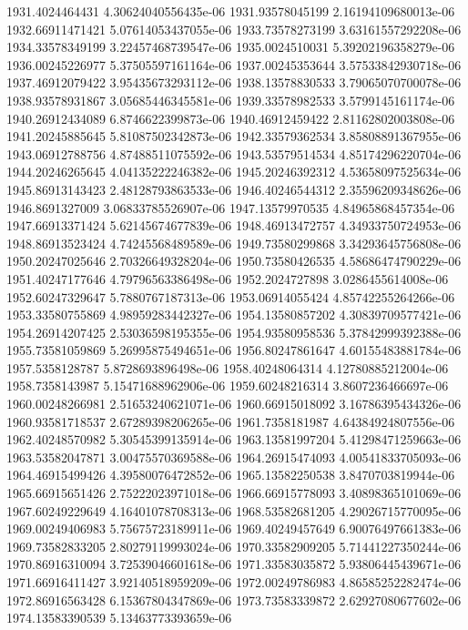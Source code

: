 {1931.4024464431 4.30624040556435e-06
1931.93578045199 2.16194109680013e-06
1932.66911471421 5.07614053437055e-06
1933.73578273199 3.63161557292208e-06
1934.33578349199 3.22457468739547e-06
1935.0024510031 5.39202196358279e-06
1936.00245226977 5.37505597161164e-06
1937.00245353644 3.57533842930718e-06
1937.46912079422 3.95435673293112e-06
1938.13578830533 3.79065070700078e-06
1938.93578931867 3.05685446345581e-06
1939.33578982533 3.5799145161174e-06
1940.26912434089 6.8746622399873e-06
1940.46912459422 2.81162802003808e-06
1941.20245885645 5.81087502342873e-06
1942.33579362534 3.85808891367955e-06
1943.06912788756 4.87488511075592e-06
1943.53579514534 4.85174296220704e-06
1944.20246265645 4.04135222246382e-06
1945.20246392312 4.53658097525634e-06
1945.86913143423 2.48128793863533e-06
1946.40246544312 2.35596209348626e-06
1946.8691327009 3.06833785526907e-06
1947.13579970535 4.84965868457354e-06
1947.66913371424 5.62145674677839e-06
1948.46913472757 4.34933750724953e-06
1948.86913523424 4.74245568489589e-06
1949.73580299868 3.34293645756808e-06
1950.20247025646 2.70326649328204e-06
1950.73580426535 4.58686474790229e-06
1951.40247177646 4.79796563386498e-06
1952.2024727898 3.0286455614008e-06
1952.60247329647 5.7880767187313e-06
1953.06914055424 4.85742255264266e-06
1953.33580755869 4.98959283442327e-06
1954.13580857202 4.30839709577421e-06
1954.26914207425 2.53036598195355e-06
1954.93580958536 5.37842999392388e-06
1955.73581059869 5.26995875494651e-06
1956.80247861647 4.60155483881784e-06
1957.5358128787 5.8728693896498e-06
1958.40248064314 4.12780885212004e-06
1958.7358143987 5.15471688962906e-06
1959.60248216314 3.8607236466697e-06
1960.00248266981 2.51653240621071e-06
1960.66915018092 3.16786395434326e-06
1960.93581718537 2.67289398206265e-06
1961.7358181987 4.64384924807556e-06
1962.40248570982 5.30545399135914e-06
1963.13581997204 5.41298471259663e-06
1963.53582047871 3.00475570369588e-06
1964.26915474093 4.00541833705093e-06
1964.46915499426 4.39580076472852e-06
1965.13582250538 3.8470703819944e-06
1965.66915651426 2.75222023971018e-06
1966.66915778093 3.40898365101069e-06
1967.60249229649 4.16401078708313e-06
1968.53582681205 4.29026715770095e-06
1969.00249406983 5.75675723189911e-06
1969.40249457649 6.90076497661383e-06
1969.73582833205 2.80279119993024e-06
1970.33582909205 5.71441227350244e-06
1970.86916310094 3.72539046601618e-06
1971.33583035872 5.93806445439671e-06
1971.66916411427 3.92140518959209e-06
1972.00249786983 4.86585252282474e-06
1972.86916563428 6.15367804347869e-06
1973.73583339872 2.62927080677602e-06
1974.13583390539 5.13463773393659e-06
}
